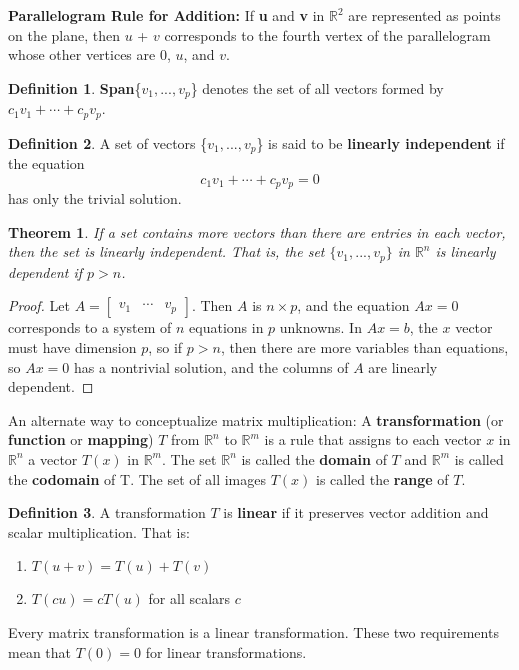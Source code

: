 \documentclass[letterpaper]{article}
\newtheorem{theorem}{Theorem}
\theoremstyle{definition}
\newtheorem{definition}{Definition}[section]
\begin{document}
\textbf{Parallelogram Rule for Addition:} If \textbf{u} and \textbf{v} in $\mathbb{R}^2$ are represented as points on the plane, then $u$ + $v$ corresponds to the fourth vertex of the parallelogram whose other vertices are 0, $u$, and $v$.

\begin{definition}
\textbf{Span}\{$v_1, ..., v_p$\} denotes the set of all vectors formed by $c_1 v_1 + \cdots + c_p v_p$. 
\end{definition}

\begin{definition}
A set of vectors \{$v_1, ..., v_p$\} is said to be \textbf{linearly independent} if the equation 
$$c_1 v_1 + \cdots + c_p v_p = 0$$ 
has only the trivial solution. 
\end{definition}

\begin{theorem}
If a set contains more vectors than there are entries in each vector, then the set is linearly independent. That is, the set $\{v_1, ..., v_p\}$ in $\mathbb{R}^n$ is linearly dependent if $p > n$. 
\end{theorem}

\begin{proof}
Let $A = \begin{bmatrix}
v_1 & \cdots & v_p
\end{bmatrix}$. Then $A$ is $n \times p$, and the equation $Ax = 0$ corresponds to a system of $n$ equations in $p$ unknowns. In $Ax = b$, the $x$ vector must have dimension $p$, so if $p>n$, then there are more variables than equations, so $Ax = 0$ has a nontrivial solution, and the columns of $A$ are linearly dependent. 
\end{proof}

An alternate way to conceptualize matrix multiplication: A \textbf{transformation} (or \textbf{function} or \textbf{mapping}) $T$ from $\mathbb{R}^n$ to $\mathbb{R}^m$ is a rule that assigns to each vector $x$ in $\mathbb{R}^n$ a vector $T(x)$ in $\mathbb{R}^m$. The set $\mathbb{R}^n$ is called the \textbf{domain} of $T$ and $\mathbb{R}^m$ is called the \textbf{codomain} of T. The set of all images $T(x)$ is called the \textbf{range} of $T$. 

\begin{definition} 
A transformation $T$ is \textbf{linear} if it preserves vector addition and scalar multiplication. That is:
\begin{enumerate}
	\item $T(u + v) = T(u) + T(v)$
	\item $T(cu) = cT(u)$ for all scalars $c$
\end{enumerate}
Every matrix transformation is a linear transformation. These two requirements mean that $T(0) = 0$ for linear transformations. 
\end{definition}
\end{document}
